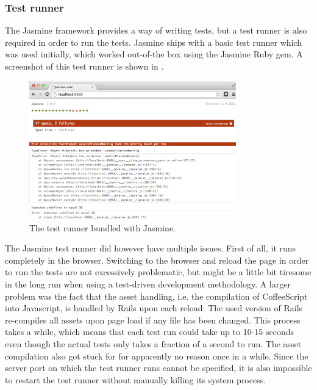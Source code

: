 \subsubsection{Test runner}
The Jasmine framework provides a way of writing tests, but a test runner
is also required in order to run the tests. Jasmine ships with a basic
test runner which was used initially, which worked out-of-the box using
the Jasmine Ruby gem. A screenshot of this test runner is shown in
.\\

\begin{figure}
\centering
\includegraphics[width=0.8\textwidth]{results/choices/jasmine_runner}
\caption{The test runner bundled with Jasmine.}
\label{fig:jasmine_runner}
\end{figure}

The Jasmine test runner did however have multiple issues. First of all,
it runs completely in the browser. Switching to the browser and reload
the page in order to run the tests are not excessively problematic, but
might be a little bit tiresome in the long run when using a test-driven
development methodology. A larger problem was the fact that the asset
handling, i.e. the compilation of CoffeeScript into Javascript, is
handled by Rails upon each reload. The used version of Rails re-compiles
all assets upon page load if any file has been changed. This process
takes a while, which means that each test run could take up to 10-15
seconds even though the actual tests only takes a fraction of a second
to run. The asset compilation also got stuck for for apparently no
reason once in a while. Since the server port on which the test runner
runs cannot be specified, it is also impossible to restart the test
runner without manually killing its system process.\\

